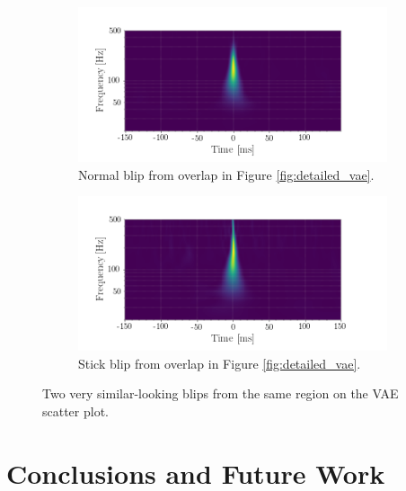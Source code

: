 \documentclass[a4paper]{article}
\begin{document}
\begin{figure}[h!]
	\centering
	\begin{subfigure}{.49\textwidth}
		\centering
		\includegraphics[width=1\linewidth]{normalish}
		\caption{Normal blip from overlap in Figure \ref{fig:detailed_vae}.}
		\label{fig:normalish}
	\end{subfigure}
	\begin{subfigure}{.49\textwidth}
		\centering
		\includegraphics[width=1\linewidth]{stickish}
		\caption{Stick blip from overlap in Figure \ref{fig:detailed_vae}.}
		\label{fig:stickish}
	\end{subfigure}
	\caption{Two very similar-looking blips from the same region on the VAE scatter plot.}
	\label{fig:overlap}
\end{figure}



\section{Conclusions and Future Work}
\end{document}
